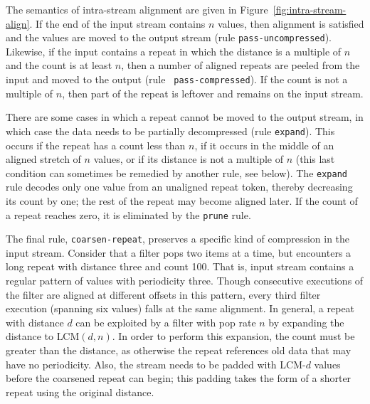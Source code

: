 The semantics of intra-stream alignment are given in
Figure~\ref{fig:intra-stream-align}.  If the end of the input stream
contains $n$ values, then alignment is satisfied and the values are
moved to the output stream (rule {\tt pass-uncompressed}).  Likewise,
if the input contains a repeat in which the distance is a multiple of
$n$ and the count is at least $n$, then a number of aligned repeats
are peeled from the input and moved to the output (rule {\tt
pass-compressed}).  If the count is not a multiple of $n$, then part
of the repeat is leftover and remains on the input stream.

There are some cases in which a repeat cannot be moved to the output
stream, in which case the data needs to be partially decompressed
(rule {\tt expand}).  This occurs if the repeat has a count less than
$n$, if it occurs in the middle of an aligned stretch of $n$ values,
or if its distance is not a multiple of $n$ (this last condition can
sometimes be remedied by another rule, see below).  The {\tt expand}
rule decodes only one value from an unaligned repeat token, thereby
decreasing its count by one; the rest of the repeat may become aligned
later.  If the count of a repeat reaches zero, it is eliminated by the
{\tt prune} rule.

The final rule, {\tt coarsen-repeat}, preserves a specific kind of
compression in the input stream.  Consider that a filter pops two
items at a time, but encounters a long repeat with distance three and
count 100.  That is, input stream contains a regular pattern of values
with periodicity three.  Though consecutive executions of the filter
are aligned at different offsets in this pattern, every third filter
execution (spanning six values) falls at the same alignment.  In
general, a repeat with distance $d$ can be exploited by a filter with
pop rate $n$ by expanding the distance to $\mbox{LCM}(d, n)$.  In
order to perform this expansion, the count must be greater than the
distance, as otherwise the repeat references old data that may have no
periodicity.  Also, the stream needs to be padded with LCM-$d$ values
before the coarsened repeat can begin; this padding takes the form of
a shorter repeat using the original distance.  

